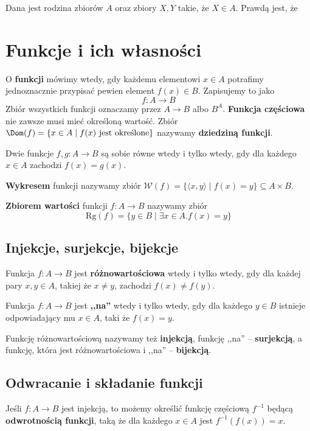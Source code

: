 \begin{problems}
    \prob Dana jest rodzina zbiorów $A$ oraz zbiory $X, Y$ takie, że $X \in A$. Prawdą jest, że
\end{problems}

\section{Funkcje i ich własności}
O \textbf{funkcji} mówimy wtedy, gdy każdemu elementowi $x \in A$ potrafimy jednoznacznie przypisać pewien element $f(x) \in B$. Zapisujemy to jako
$$f : A \to B$$
Zbiór wszystkich funkcji oznaczamy przez $A \to B$ albo $B^A$.
\textbf{Funkcja częściowa} nie zawsze musi mieć określoną wartość. Zbiór $\Dom(f) = \{ x \in A \; | \; f(x) \text{ jest określone} \}$ nazywamy \textbf{dziedziną funkcji}.

Dwie funkcje $f, g : A \to B$ są sobie równe wtedy i tylko wtedy, gdy dla każdego $x \in A$ zachodzi
$f(x) = g(x)$.

\textbf{Wykresem} funkcji nazywamy zbiór $\mathcal{W}(f) = \{ \langle x, y \rangle \; | \; f(x) = y \} \subseteq A \times B$. 

\textbf{Zbiorem wartości} funkcji $f : A \to B$ nazywamy zbiór
$$\text{Rg}(f) = \{ y \in B \; | \; \exists x \in A . f(x) = y \}$$

\subsection{Injekcje, surjekcje, bijekcje}

Funkcja $f : A \to B$ jest \textbf{różnowartościowa} wtedy i tylko wtedy, gdy dla każdej pary $x, y \in A$, takiej że $x \neq y$, zachodzi $f(x) \neq f(y)$.

Funkcja $f : A \to B$ jest \textbf{,,na''} wtedy i tylko wtedy, gdy dla każdego $y \in B$ istnieje odpowiadający mu $x \in A$, taki że $f(x) = y$.

Funkcję różnowartościową nazywamy też \textbf{injekcją}, funkcję ,,na'' -- \textbf{surjekcją}, a funkcję, która jest różnowartościowa i ,,na'' -- \textbf{bijekcją}.

\subsection{Odwracanie i składanie funkcji}
Jeśli $f : A \to B$ jest injekcją, to możemy określić funkcję częściową $f^{-1}$ będącą \textbf{odwrotnością funkcji}, taką że dla każdego $x \in A$ jest $f^{-1}(f(x)) = x$.

